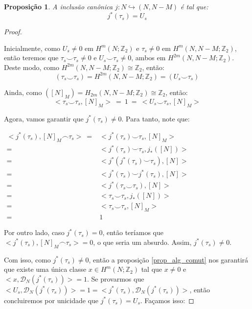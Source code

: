 \documentclass[12pt,oneside]{book} %
\newtheorem{prop}   {\hspace{0.5cm}Proposi\c c\~ao}[chapter]
\newcommand{\Z}{\mathbb{Z}}
\newcommand{\ccup}{\smile}
\newcommand{\ccap}{\frown}
\begin{document}
\begin{prop}\label{principal}
	A inclusão canônica $j:N\hookrightarrow (N,N-M)$ é tal que:
	$$ j^{*}(\tau_{s})=U_{s} $$
\end{prop}
\begin{proof}
	
	\
	
	\par Inicialmente, como $U_{s}\neq 0$ em $H^{m}(N;\Z_{2})$ e $\tau_{s}\neq 0$ em $H^{m}(N,N-M;\Z_{2})$, então teremos que $\tau_{s}\ccup\tau_{s}\neq 0$ e $U_{s}\ccup\tau_{s}\neq 0$, ambos em $H^{2m}(N,N-M;\Z_{2})$. Deste modo, como $H^{2m}(N,N-M;\Z_{2})\cong\Z_{2}$, então:
	$$ (\tau_{s}\ccup\tau_{s})=H^{2m}(N,N-M;\Z_{2})=(U_{s}\ccup\tau_{s}) $$
	
	\par Ainda, como $([N]_{M})=H_{2m}(N,N-M;\Z_{2})\cong\Z_{2}$, então:
	$$ <\tau_{s}\ccup\tau_{s},[N]_{M}> \ = \ 1 \ = \ <U_{s}\ccup\tau_{s},[N]_{M}> $$
	
	\par Agora, vamos garantir que $j^{*}(\tau_{s})\neq 0$. Para tanto, note que: \newline
	
	$\begin{array}{rl}
		<j^{*}(\tau_{s}),[N]_{M}\ccap \tau_{s}> \ = & <j^{*}(\tau_{s})\ccup\tau_{s},[N]_{M}> \\
		= & <j^{*}(\tau_{s})\ccup\tau_{s},j_{*}([N])> \\
		= & <j^{*}(j^{*}(\tau_{s})\ccup\tau_{s}),[N]> \\
		= & <j^{*}(\tau_{s})\ccup j^{*}(\tau_{s}),[N]> \\
		= & <j^{*}(\tau_{s}\ccup\tau_{s}),[N]> \\
		= & <\tau_{s}\ccup\tau_{s},j_{*}([N])> \\
		= & <\tau_{s}\ccup\tau_{s},[N]_{M}> \\
		= & 1
	\end{array}$\newline
	
	\par Por outro lado, caso $j^{*}(\tau_{s})=0$, então teríamos que $<j^{*}(\tau_{s}),[N]_{M}\ccap \tau_{s}>=0$, o que seria um absurdo. Assim, $j^{*}(\tau_{s})\neq 0$.
	
	\par Com isso, como $j^{*}(\tau_{s})\neq 0$, então a proposição \ref{prop_alg_comut} nos garantirá que existe uma única classe $x\in H^{m}(N;\Z_{2})$ tal que $x\neq 0$ e $<x,\mathcal{D}_{N}(j^{*}(\tau_{s}))>=1$. Se provarmos que $<U_{s},\mathcal{D}_{N}(j^{*}(\tau_{s}))>=1=<j^{*}(\tau_{s}),\mathcal{D}_{N}(j^{*}(\tau_{s}))>$, então concluiremos por unicidade que $j^{*}(\tau_{s})=U_{s}$. Façamos isso: \newline
	

\end{proof}
\end{document}
